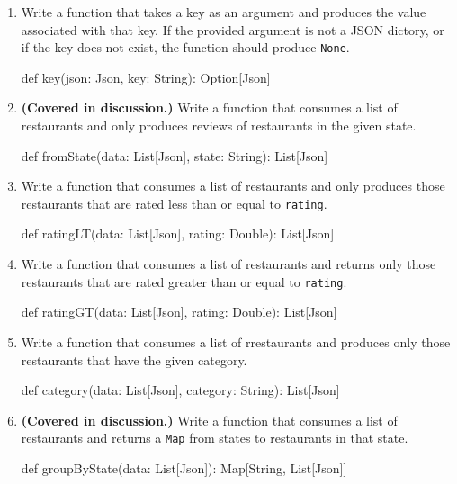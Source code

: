 \documentclass[9pt]{extbook}
\begin{document}
\begin{enumerate}

    \item Write a function that takes a key as an argument and produces the
    value associated with that key. If the provided argument is not a JSON
    dictory, or if the key does not exist, the function should produce
    \lstinline|None|.
    \begin{scalacode}
    def key(json: Json, key: String): Option[Json]
    \end{scalacode}

    \item \textbf{(Covered in discussion.)} Write a function that consumes a
    list of restaurants and only produces reviews of restaurants in the given
    state.
    \begin{scalacode}
    def fromState(data: List[Json], state: String): List[Json]
    \end{scalacode}

    \item Write a function that consumes a list of restaurants and only
    produces those restaurants that are rated less than
    or equal to \lstinline|rating|.
    \begin{scalacode}
    def ratingLT(data: List[Json], rating: Double): List[Json]
    \end{scalacode}

    \item Write a function that consumes a list of restaurants
    and returns only those restaurants that are rated greater than
    or equal to \lstinline|rating|.
    \begin{scalacode}
    def ratingGT(data: List[Json], rating: Double): List[Json]
    \end{scalacode}

    \item Write a function that consumes a list of rrestaurants
     and produces only those restaurants
    that have the given category.
    \begin{scalacode}
    def category(data: List[Json], category: String): List[Json]
    \end{scalacode}

    \item \textbf{(Covered in discussion.)} Write a function that consumes a
    list of restaurants and returns a \lstinline|Map| from states to
    restaurants in that state.
    \begin{scalacode}
    def groupByState(data: List[Json]): Map[String, List[Json]]
    \end{scalacode}


\end{enumerate}
\end{document}
